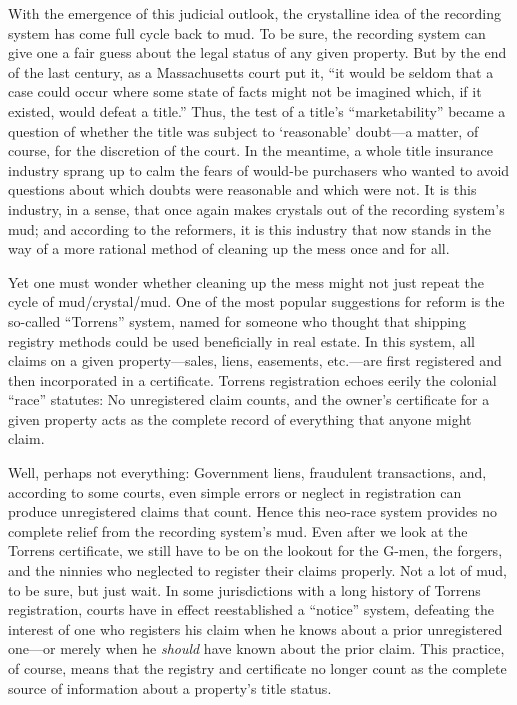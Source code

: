 With the emergence of this judicial outlook, the crystalline idea of the
recording system has come full cycle back to mud. To be sure, the recording
system can give one a fair guess about the legal status of any given property.
But by the end of the last century, as a Massachusetts court put it, ``it would
be seldom that a case could occur where some state of facts might not be
imagined which, if it existed, would defeat a title.'' Thus, the test of a
title's ``marketability'' became a question of whether the title was subject to
`reasonable' doubt---a matter, of course, for the discretion of the court. In
the meantime, a whole title insurance industry sprang up to calm the fears of
would-be purchasers who wanted to avoid questions about which doubts were
reasonable and which were not. It is this industry, in a sense, that once again
makes crystals out of the recording system's mud; and according to the
reformers, it is this industry that now stands in the way of a more rational
method of cleaning up the mess once and for all. 

Yet one must wonder whether cleaning up the mess might not just repeat the cycle
of mud/crystal/mud. One of the most popular suggestions for reform is the
so-called ``Torrens'' system, named for someone who thought that shipping
registry methods could be used beneficially in real estate. In this system, all
claims on a given property---sales, liens, easements, etc.---are first
registered and then incorporated in a certificate. Torrens registration echoes
eerily the colonial ``race'' statutes: No unregistered claim counts, and the
owner's certificate for a given property acts as the complete record of
everything that anyone might claim.

Well, perhaps not everything: Government liens, fraudulent transactions, and,
according to some courts, even simple errors or neglect in registration can
produce unregistered claims that count. Hence this neo-race system provides no
complete relief from the recording system's mud. Even after we look at the
Torrens certificate, we still have to be on the lookout for the G-men, the
forgers, and the ninnies who neglected to register their claims properly. Not a
lot of mud, to be sure, but just wait. In some jurisdictions with a long
history of Torrens registration, courts have in effect reestablished a
``notice''
system, defeating the interest of one who registers his claim when he knows
about a prior unregistered one---or merely when he \textit{should} have known
about the prior claim. This practice, of course, means that the registry and
certificate no longer count as the complete source of information about a
property's title status.

